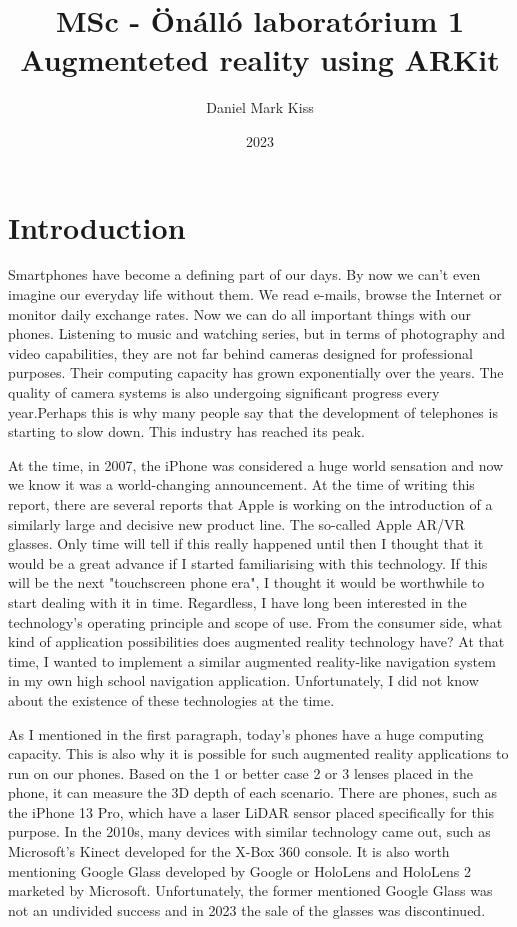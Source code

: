 \documentclass{report}
\title{\Huge{MSc - Önálló laboratórium 1}\\Augmenteted reality using ARKit}
\author{\huge{Daniel Mark Kiss}}
\date{2023}
\begin{document}
\maketitle
\newpage
\tableofcontents
\pagebreak

\chapter{Introduction}

Smartphones have become a defining part of our days. By now we can't even imagine our everyday life without them. We read e-mails, browse the Internet or monitor daily exchange rates. Now we can do all important things with our phones. Listening to music and watching series, but in terms of photography and video capabilities, they are not far behind cameras designed for professional purposes. Their computing capacity has grown exponentially over the years. The quality of camera systems is also undergoing significant progress every year.Perhaps this is why many people say that the development of telephones is starting to slow down. This industry has reached its peak.

At the time, in 2007, the iPhone was considered a huge world sensation and now we know it was a world-changing announcement. At the time of writing this report, there are several reports that Apple is working on the introduction of a similarly large and decisive new product line. The so-called Apple AR/VR glasses. Only time will tell if this really happened until then I thought that it would be a great advance if I started familiarising with this technology. If this will be the next "touchscreen phone era", I thought it would be worthwhile to start dealing with it in time. Regardless, I have long been interested in the technology's operating principle and scope of use. From the consumer side, what kind of application possibilities does augmented reality technology have? At that time, I wanted to implement a similar augmented reality-like navigation system in my own high school navigation application. Unfortunately, I did not know about the existence of these technologies at the time.

As I mentioned in the first paragraph, today's phones have a huge computing capacity. This is also why it is possible for such augmented reality applications to run on our phones. Based on the 1 or better case 2 or 3 lenses placed in the phone, it can measure the 3D depth of each scenario. There are phones, such as the iPhone 13 Pro, which have a laser LiDAR sensor placed specifically for this purpose. In the 2010s, many devices with similar technology came out, such as Microsoft's Kinect developed for the X-Box 360 console. It is also worth mentioning Google Glass developed by Google or HoloLens and HoloLens 2 marketed by Microsoft. Unfortunately, the former mentioned Google Glass was not an undivided success and in 2023 the sale of the glasses was discontinued.
\end{document}
